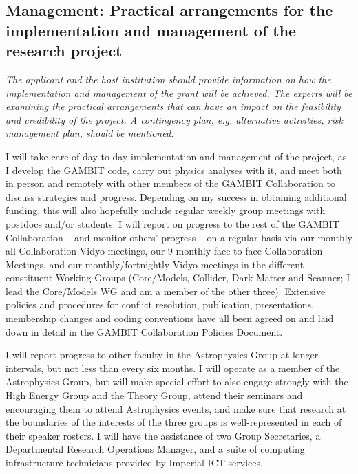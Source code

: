 \documentclass[a4paper,11pt]{article}
\newenvironment{xcomment}{\em}{}
\begin{document}
\subsection{Management: Practical arrangements for the implementation and management of the research project}

\begin{xcomment}
The applicant and the host institution should provide information on
how the implementation and management of the grant will be
achieved. The experts will be examining the practical arrangements
that can have an impact on the feasibility and credibility of the
project. A contingency plan, e.g. alternative activities, risk
management plan, should be mentioned.
\end{xcomment}

I will take care of day-to-day implementation and management of the project, as I develop the GAMBIT code, carry out physics analyses with it, and meet both in person and remotely with other members of the GAMBIT Collaboration to discuss strategies and progress.  Depending on my success in obtaining additional funding, this will also hopefully include regular weekly group meetings with postdocs and/or students.  I will report on progress to the rest of the GAMBIT Collaboration -- and monitor others' progress -- on a regular basis via our monthly all-Collaboration Vidyo meetings, our 9-monthly face-to-face Collaboration Meetings, and our monthly/fortnightly Vidyo meetings in the different constituent Working Groups (Core/Models, Collider, Dark Matter and Scanner; I lead the Core/Models WG and am a member of the other three).  Extensive policies and procedures for conflict resolution, publication, presentations, membership changes and coding conventions have all been agreed on and laid down in detail in the GAMBIT Collaboration Policies Document.

I will report progress to other faculty in the Astrophysics Group at longer intervals, but not less than every six months.  I will operate as a member of the Astrophysics Group, but will make special effort to also engage strongly with the High Energy Group and the Theory Group, attend their seminars and encouraging them to attend Astrophysics events, and make sure that research at the boundaries of the interests of the three groups is well-represented in each of their speaker rosters.  I will have the assistance of two Group Secretaries, a Departmental Research Operations Manager, and a suite of computing infrastructure technicians provided by Imperial ICT services.
\end{document}
